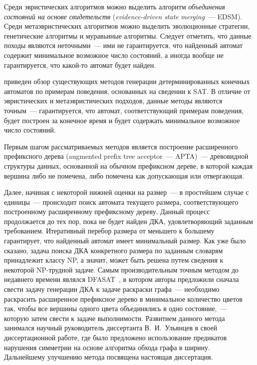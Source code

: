 Среди эвристических алгоритмов можно выделить алгоритм \emph{объединения состояний на основе свидетельств} (\emph{evidence-driven state merging}~--- EDSM).
Среди метаэвристических алгоритмов можно выделить эволюционные стратегии, генетические алгоритмы и муравьиные алгоритмы.
Следует отметить, что данные походы являются неточными~--- ими не гарантируется, что найденный автомат содержит минимальное возможное число состояний, а иногда вообще не гарантируется, что какой-то автомат будет найден.


\insection{\ref{sec:review:sat-dfa-inf}} приведен обзор существующих методов генерации детерминированных конечных автоматов по примерам поведения, основанных на сведении к SAT. В отличие от эвристических и метаэвристических подходов, данные методы являются точным~--- гарантируется, что автомат, соответствующий примерам поведения, будет построен за конечное время и будет содержать минимальное возможное число состояний.

Первым шагом рассматриваемых методов является построение расширенного префиксного дерева (augmented prefix tree acceptor~--- APTA)~--- древовидной структуры данных, основанной на обычном префиксном дереве, в которой каждая вершина либо не помечена, либо помечена как допускающая или отвергающая.

Далее, начиная с некоторой нижней оценки на размер~--- в простейшем случае с единицы~--- происходит поиск автомата текущего размера, соответствующего построенному расширенному префиксному дереву. 
Данный процесс продолжается до тех пор, пока не будет найден ДКА, удовлетворяющий заданным требованием.
Итеративный перебор размера от меньшего к большему гарантирует, что найденный автомат имеет минимальный размер.
Как уже было сказано, задача поиска ДКА конкретного размера по заданным словарям принадлежит классу NP, а значит, может быть решена путем сведения к некоторой NP-трудной задаче.
Самым производительным точным методом до недавнего времени являлся DFASAT~\cite{heule-icgi10}, в котором авторы предложили сначала свести задачу генерации ДКА к задаче раскраски графа~--- необходимо раскрасить расширенное префиксное дерево в минимальное количество цветов так, чтобы все вершины одного цвета объединялись в одно состояние,~--- которую затем свести к задаче выполнимости.
Развитием данного метода занимался научный руководитель диссертанта В.~И.~Ульянцев в своей диссертационной работе, где было предложено использование предикатов нарушения симметрии на основе алгоритма обхода графа в ширину.
Дальнейшему улучшению метода посвящена настоящая диссертация.

